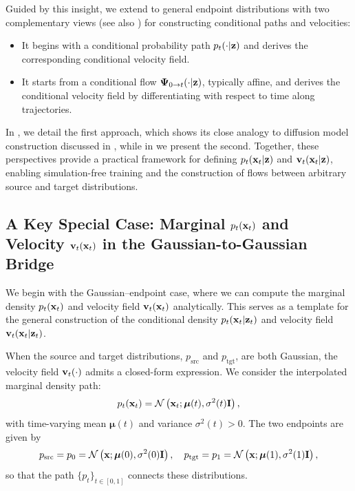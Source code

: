 Guided by this insight, we extend to general endpoint distributions with two complementary views (see also ) for constructing conditional paths and velocities:
\begin{itemize}
    \item {} It begins with a conditional probability path $p_t(\cdot|{\mathbf{z}})$ and derives the corresponding conditional velocity field.
    \item {} It starts from a conditional flow ${\bm{\Psi}}_{0\to t}(\cdot|{\mathbf{z}})$, typically affine, and derives the conditional velocity field by differentiating with respect to time along trajectories.
\end{itemize}


In , we detail the first approach, which shows its close analogy to diffusion model construction discussed in , while in  we present the second. Together, these perspectives provide a practical framework for defining $p_t({\mathbf{x}}_t| {\mathbf{z}})$ and ${\mathbf{v}}_t({\mathbf{x}}_t| {\mathbf{z}})$, enabling simulation-free training and the construction of flows between arbitrary source and target distributions.





\subsection{A Key Special Case: Marginal $p_t({\mathbf{x}}_t)$ and Velocity ${\mathbf{v}}_t({\mathbf{x}}_t)$ in the Gaussian-to-Gaussian Bridge}\label{subsec:special-fm-instantiations}

We begin with the Gaussian–endpoint case, where we can compute the marginal density $p_t({\mathbf{x}}_t)$ and velocity field ${\mathbf{v}}_t({\mathbf{x}}_t)$ analytically. This serves as a template for the general construction of the conditional density $p_t({\mathbf{x}}_t |{\mathbf{z}}_t)$ and velocity field ${\mathbf{v}}_t({\mathbf{x}}_t |{\mathbf{z}}_t)$.


 
When the source and target distributions, $p_{\text{src}}$ and $p_{\text{tgt}}$, are both Gaussian, the velocity field ${\mathbf{v}}_t(\cdot)$ admits a closed-form expression. We consider the interpolated marginal density path:
\begin{align}\label{eq:gaussian-density-path}
    p_t({\mathbf{x}}_t) = \mathcal{N}\left({\mathbf{x}}_t; \bm{\mu}(t), \sigma^2(t) {\mathbf{I}}\right),
\end{align}
with time-varying mean $\bm{\mu}(t)$ and variance $\sigma^2(t)>0$. The two endpoints are given by
\[
p_{\text{src}} = p_0 =  \mathcal{N}\left({\mathbf{x}}; \bm{\mu}(0), \sigma^2(0) {\mathbf{I}}\right), \quad
p_{\text{tgt}} = p_1 =  \mathcal{N}\left({\mathbf{x}}; \bm{\mu}(1), \sigma^2(1) {\mathbf{I}}\right),
\]
so that the path $\{p_t\}_{t \in [0,1]}$ connects these distributions.

